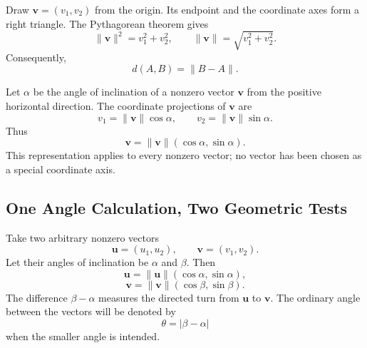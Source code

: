 Draw $\mathbf v=(v_1,v_2)$ from the origin. Its endpoint and the coordinate axes
form a right triangle. The Pythagorean theorem gives
\[
\|\mathbf v\|^2=v_1^2+v_2^2,
\qquad
\|\mathbf v\|=\sqrt{v_1^2+v_2^2}.
\]
Consequently,
\[
d(A,B)=\|B-A\|.
\]

\begin{center}
\end{center}

Let $\alpha$ be the angle of inclination of a nonzero vector $\mathbf v$ from
the positive horizontal direction. The coordinate projections of $\mathbf v$
are
\[
v_1=\|\mathbf v\|\cos\alpha,
\qquad
v_2=\|\mathbf v\|\sin\alpha.
\]
Thus
\[
\mathbf v
=
\|\mathbf v\|(\cos\alpha,\sin\alpha).
\]
This representation applies to every nonzero vector; no vector has been chosen
as a special coordinate axis.

\subsection{One Angle Calculation, Two Geometric Tests}

Take two arbitrary nonzero vectors
\[
\mathbf u=(u_1,u_2),
\qquad
\mathbf v=(v_1,v_2).
\]
Let their angles of inclination be $\alpha$ and $\beta$. Then
\[
\mathbf u
=
\|\mathbf u\|(\cos\alpha,\sin\alpha),
\]
\[
\mathbf v
=
\|\mathbf v\|(\cos\beta,\sin\beta).
\]
The difference $\beta-\alpha$ measures the directed turn from $\mathbf u$ to
$\mathbf v$. The ordinary angle between the vectors will be denoted by
\[
\theta=|\beta-\alpha|
\]
when the smaller angle is intended.

\begin{center}
\end{center}

